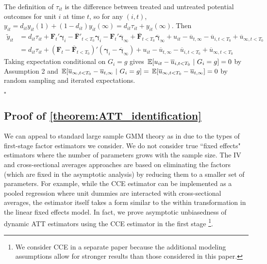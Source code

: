 The definition of $\tau_{it}$ is the difference between treated and untreated potential outcomes for unit $i$ at time $t$, so for any $(i,t)$, $y_{it} = d_{it} y_{it}(1) + (1-d_{it})y_{it}(\infty) = d_{it} \tau_{it} + y_{it}(\infty)$. Then
\begin{align*}
    \tilde{y}_{it} 
    &= d_{it} \tau_{it} + \bm{F}_t' \bm \gamma_i - \overline{\bm{F}}'_{t < T_0} \bm \gamma_i - \bm{F}_t' \overline{\bm \gamma}_{\infty} + \overline{\bm{F}}_{t < T_0} \overline{\bm \gamma}_{\infty} + u_{it} - \overline{u}_{t,\infty} - \overline{u}_{i, t < T_0} + \overline{u}_{\infty, t < T_0}\\
    &= d_{it} \tau_{it} + (\bm{F}_t - \overline{\bm{F}}_{t < T_0})' (\bm \gamma_i - \overline{\bm \gamma}_{\infty}) + u_{it} - \overline{u}_{t,\infty} - \overline{u}_{i, t < T_0} + \overline{u}_{\infty, t < T_0}
\end{align*}
Taking expectation conditional on $G_i = g$ gives $\expec{u_{it} - \overline{u}_{i, t < T_0}}{G_i = g} = 0$ by Assumption 2 and $\expec{\overline{u}_{\infty, t < T_0} - \overline{u}_{t, \infty} }{G_i = g} = \expec{\overline{u}_{\infty, t < T_0} - \overline{u}_{t, \infty}} = 0$ by random sampling and iterated expectations.

$\square$

\subsection{Proof of \autoref{theorem:ATT_identification}}

We can appeal to standard large sample GMM theory as in \citet{Hansen_1982} due to the types of first-stage factor estimators we consider. We do not consider true ``fixed effects" estimators where the number of parameters grows with the sample size. The IV and cross-sectional averages approaches are based on eliminating the factors (which are fixed in the asymptotic analysis) by reducing them to a smaller set of parameters. For example, while the CCE estimator can be implemented as a pooled regression where unit dummies are interacted with cross-sectional averages, the estimator itself takes a form similar to the within transformation in the linear fixed effects model. In fact, we prove asymptotic unbiasedness of dynamic ATT estimators using the CCE estimator in the first stage \citep{Brown_Butts_Westerlund_2023}\footnote{We consider CCE in a separate paper because the additional modeling assumptions allow for stronger results than those considered in this paper.}.

